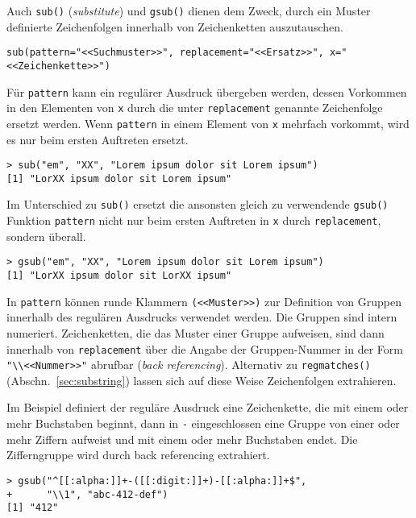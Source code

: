 Auch \lstinline!sub()! (\emph{substitute}) und \lstinline!gsub()! dienen dem Zweck, durch ein Muster definierte Zeichenfolgen innerhalb von Zeichenketten auszutauschen.
\begin{lstlisting}
sub(pattern="<<Suchmuster>>", replacement="<<Ersatz>>", x="<<Zeichenkette>>")
\end{lstlisting}

Für \lstinline!pattern! kann ein regulärer Ausdruck übergeben werden, dessen Vorkommen in den Elementen von \lstinline!x! durch die unter \lstinline!replacement! genannte Zeichenfolge ersetzt werden. Wenn \lstinline!pattern! in einem Element von \lstinline!x! mehrfach vorkommt, wird es nur beim ersten Auftreten ersetzt.
\begin{lstlisting}
> sub("em", "XX", "Lorem ipsum dolor sit Lorem ipsum")
[1] "LorXX ipsum dolor sit Lorem ipsum"
\end{lstlisting}

Im Unterschied zu \lstinline!sub()! ersetzt die ansonsten gleich zu verwendende \lstinline!gsub()! Funktion \lstinline!pattern! nicht nur beim ersten Auftreten in \lstinline!x! durch \lstinline!replacement!, sondern überall.
\begin{lstlisting}
> gsub("em", "XX", "Lorem ipsum dolor sit Lorem ipsum")
[1] "LorXX ipsum dolor sit LorXX ipsum"
\end{lstlisting}

In \lstinline!pattern! können runde Klammern \lstinline!(<<Muster>>)! zur Definition von Gruppen innerhalb des regulären Ausdrucks verwendet werden. Die Gruppen sind intern numeriert. Zeichenketten, die das Muster einer Gruppe aufweisen, sind dann innerhalb von \lstinline!replacement! über die Angabe der Gruppen-Nummer in der Form \lstinline!"\\<<Nummer>>"! abrufbar (\emph{back referencing}). Alternativ zu \lstinline!regmatches()! (Abschn.\ \ref{sec:substring}) lassen sich auf diese Weise Zeichenfolgen extrahieren.

Im Beispiel definiert der reguläre Ausdruck eine Zeichenkette, die mit einem oder mehr Buchstaben beginnt, dann in \lstinline!-! eingeschlossen eine Gruppe von einer oder mehr Ziffern aufweist und mit einem oder mehr Buchstaben endet. Die Zifferngruppe wird durch back referencing extrahiert.
\begin{lstlisting}
> gsub("^[[:alpha:]]+-([[:digit:]]+)-[[:alpha:]]+$",
+      "\\1", "abc-412-def")
[1] "412"
\end{lstlisting}

